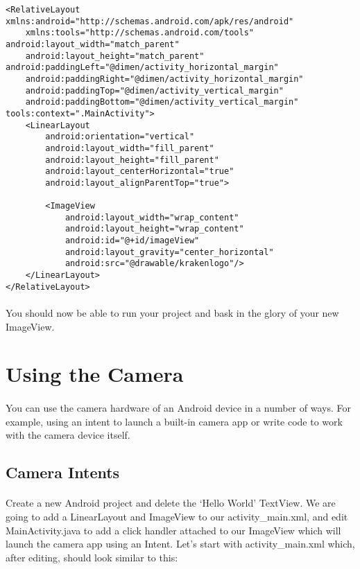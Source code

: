 \begin{lstlisting}
<RelativeLayout xmlns:android="http://schemas.android.com/apk/res/android"
    xmlns:tools="http://schemas.android.com/tools" android:layout_width="match_parent"
    android:layout_height="match_parent" android:paddingLeft="@dimen/activity_horizontal_margin"
    android:paddingRight="@dimen/activity_horizontal_margin"
    android:paddingTop="@dimen/activity_vertical_margin"
    android:paddingBottom="@dimen/activity_vertical_margin" tools:context=".MainActivity">
    <LinearLayout
        android:orientation="vertical"
        android:layout_width="fill_parent"
        android:layout_height="fill_parent"
        android:layout_centerHorizontal="true"
        android:layout_alignParentTop="true">

        <ImageView
            android:layout_width="wrap_content"
            android:layout_height="wrap_content"
            android:id="@+id/imageView"
            android:layout_gravity="center_horizontal"
            android:src="@drawable/krakenlogo"/>
    </LinearLayout>
</RelativeLayout>
\end{lstlisting}

\paragraph{} You should now be able to run your project and bask in the glory of your new ImageView.

\section{Using the Camera}
\paragraph{} You can use the camera hardware of an Android device in a number of ways. For example, using an intent to launch a built-in camera app or write code to work with the camera device itself.

\subsection{Camera Intents}
\paragraph{} Create a new Android project and delete the `Hello World' TextView. We are going to add a LinearLayout and ImageView to our activity\_main.xml, and edit MainActivity.java to add a click handler attached to our ImageView which will launch the camera app using an Intent. Let's start with activity\_main.xml which, after editing, should look similar to this:

